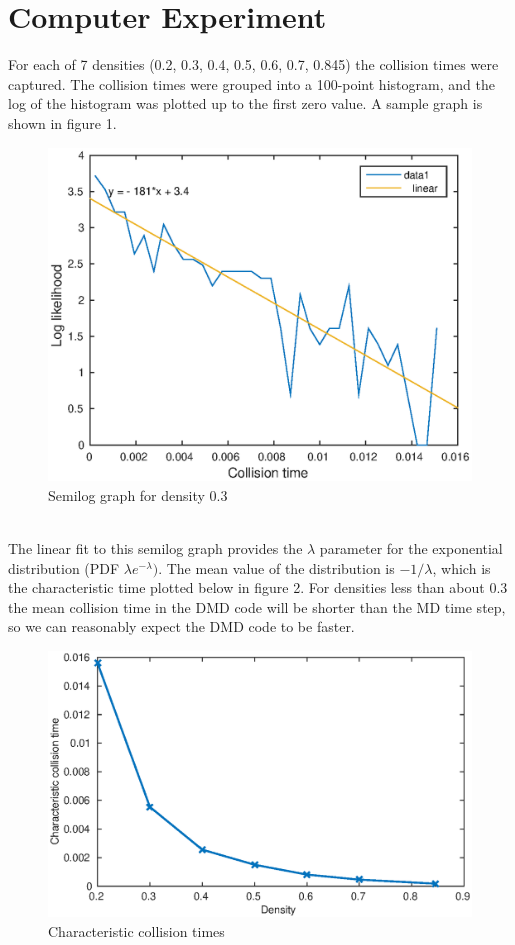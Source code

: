 \documentclass[a4paper,11pt]{article}
\numberwithin{equation}{section}
\begin{document}
\section{Computer Experiment}
For each of 7 densities (0.2, 0.3, 0.4, 0.5, 0.6, 0.7, 0.845) the collision times were captured.
The collision times were grouped into a 100-point histogram, and the log of the histogram was plotted up to the first zero value.
A sample graph is shown in figure 1.\\
\begin{figure}[h]
 \caption{Semilog graph for density 0.3}
 \centering
   \includegraphics[width=\textwidth]{hist_d03}
\end{figure}
\\
The linear fit to this semilog graph provides the $\lambda$ parameter for the exponential distribution (PDF $\lambda e^{-\lambda})$.
The mean value of the distribution is $-1/\lambda$, which is the characteristic time plotted below in figure 2. 
For densities less than about 0.3 the mean collision time in the DMD code will be shorter than the MD time step, so we can reasonably expect the DMD code to be faster.
\begin{figure}[h]
 \caption{Characteristic collision times}
 \centering
   \includegraphics[width=\textwidth]{collisionTimes}
\end{figure}
\end{document}
